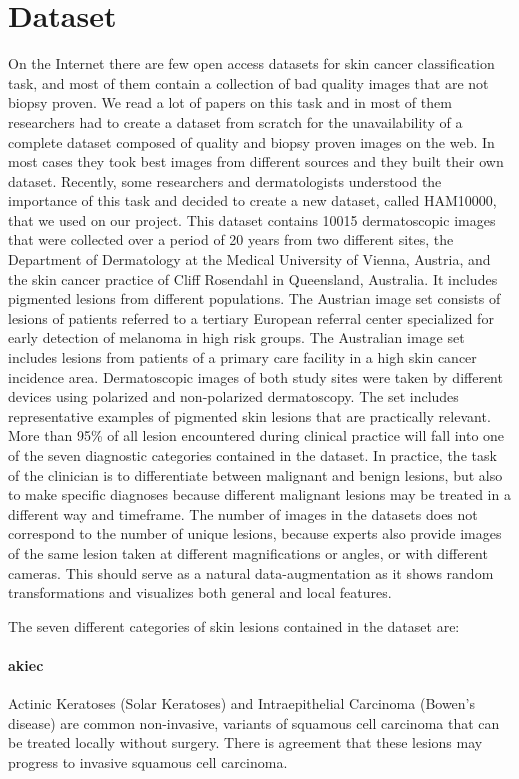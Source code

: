 \section{Dataset}
	On the Internet there are few open access datasets for skin cancer classification task, and most of them contain a collection of bad quality images that are not biopsy proven. We read a lot of papers on this task and in most of them researchers had to create a dataset from scratch for the unavailability of a complete dataset composed of quality and biopsy proven images on the web. In most cases they took best images from different sources and they built their own dataset. Recently, some researchers and dermatologists understood the importance of this task and decided to create a new dataset, called HAM10000, that we used on our project. 
	This dataset contains 10015 dermatoscopic images that were collected over a period of 20 years from two different sites, the Department of Dermatology at the Medical University of Vienna, Austria, and the skin cancer practice of Cliff Rosendahl in Queensland, Australia. It includes pigmented lesions from different populations. The Austrian image set consists of lesions of patients referred to a tertiary European referral center specialized for early detection of melanoma in high risk groups. The Australian image set includes lesions from patients of a primary care facility in a high skin cancer incidence area. Dermatoscopic images of both study sites were taken by different devices using polarized and non-polarized dermatoscopy. The set includes representative examples of pigmented skin lesions that are practically relevant. More than 95\% of all lesion encountered during clinical practice will fall into one of the seven diagnostic categories contained in the dataset. In practice, the task of the clinician is to differentiate between malignant and benign lesions, but also to make specific diagnoses because different malignant lesions may be treated in a different way and timeframe. The number of images in the datasets does not correspond to the number of unique lesions, because experts also provide images of the same lesion taken at different magnifications or angles, or with different cameras. This should serve as a natural data-augmentation as it shows random transformations and visualizes both general and local features.
	
	\bigskip
	
	The seven different categories of skin lesions contained in the dataset are:
	
	\paragraph{akiec}
	Actinic Keratoses (Solar Keratoses) and Intraepithelial Carcinoma (Bowen’s disease) are common non-invasive, variants of squamous cell carcinoma that can be treated locally without surgery. There is agreement that these lesions may progress to invasive squamous cell carcinoma. 
	
